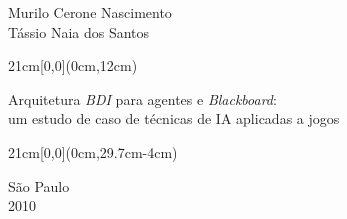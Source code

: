 \begin{center}
  {\large Murilo Cerone Nascimento \\
    Tássio Naia dos Santos}
\end{center}

\begin{textblock*}{21cm}[0,0](0cm,12cm)
  \begin{center}
    {\LARGE Arquitetura \emph{BDI} para agentes e \emph{Blackboard}:\\
      um estudo de caso de técnicas de IA aplicadas a jogos}
  \end{center}
\end{textblock*}


\begin{textblock*}{21cm}[0,0](0cm,29.7cm-4cm)
  \begin{center}
    {\large São Paulo \\ 2010 }
  \end{center}
\end{textblock*}


